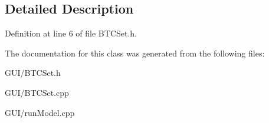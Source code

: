 \subsection{Detailed Description}


Definition at line 6 of file B\+T\+C\+Set.\+h.



The documentation for this class was generated from the following files\+:\begin{DoxyCompactItemize}
\item 
G\+U\+I/B\+T\+C\+Set.\+h\item 
G\+U\+I/B\+T\+C\+Set.\+cpp\item 
G\+U\+I/run\+Model.\+cpp\end{DoxyCompactItemize}

